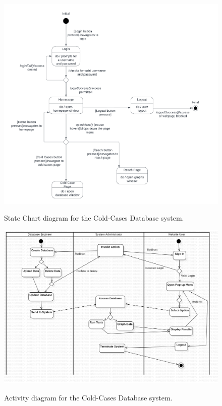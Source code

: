 \documentclass[11pt]{article}
\begin{document}
\begin{figure}[!ht]
\centering
	\includegraphics[width=.95\textwidth]{./State Chart/C.C. Statechart}\\
	\caption{State Chart diagram for the Cold-Cases Database system.}
	\label{fig:state_chart_diagram}
\end{figure}
\clearpage

\begin{figure}[!ht]
\centering
	\includegraphics[width=.95\textwidth]{./Activity Diagram/activitydiagram2}\\
	\caption{Activity diagram for the Cold-Cases Database system.}
	\label{fig:activity_diagram}
\end{figure}
\clearpage
\end{document}
